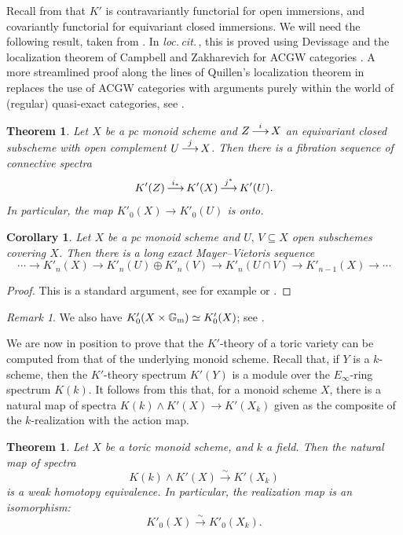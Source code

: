 \documentclass[12pt]{amsart}
\def\lra{\longrightarrow}
\def\map#1{\,{\buildrel #1 \over \lra}\,}
\newcommand{\G}{\mathbb{G}}
\newcommand{\Gm}{\G_{\text m}}
\numberwithin{equation}{section}
\theoremstyle{plain}
\newtheorem{thm}[equation]{Theorem}
\newtheorem{cor}[equation]{Corollary}
\theoremstyle{definition}
\theoremstyle{remark}
\newtheorem{rem}[equation]{Remark}
\begin{document}
Recall from \cite[5.1.2]{HW} that $K'$ is contravariantly functorial
for open immersions, and covariantly functorial for equivariant closed
immersions. We will need the following result, taken from
\cite[Thm. 5.3]{HW}. In {\it loc.\,cit.\,}, this is proved using
Devissage \cite[Thm. 3.2]{HW} and the localization theorem of Campbell
and Zakharevich for ACGW categories \cite[8.5]{CZ}. A more streamlined
proof along the lines of Quillen's localization theorem in
\cite[Section 7]{Quillen} replaces the use of ACGW categories with
arguments purely within the world of (regular) quasi-exact categories,
see \cite[Section 4]{CW}.
 

\begin{thm}\label{thm:K-loc}
	Let $X$ be a pc monoid scheme and $Z\map{i} X$ an equivariant closed subscheme
	with open complement $U\map{j} X$. Then there is a fibration sequence of connective spectra
	\[
	K'(Z)\map{i_*} K'(X) \map{j^*} K'(U).
	\]
In particular, the map $K'_0(X)\to K'_0(U)$ is onto. 
\end{thm}

\begin{cor}\label{cor:K'-MV}
  Let $X$ be a pc monoid scheme and $U,\,V\subseteq X$
  open subschemes covering $X$. 
	Then there is a long exact Mayer--Vietoris sequence
\[
\dotsm \to K'_n(X)\to K'_n(U)\oplus K'_n(V)\to K'_n(U\cap V) \to K'_{n-1}(X)\to \dotsm
\]
\end{cor}

\begin{proof}
  This is a standard argument, see for example
  \cite[Prop.\,4]{BG} or \cite[V.6.11.2]{WK}.
\end{proof}

\begin{rem}
We also have $K'_0(X\times\Gm)\simeq K'_0(X)$; see \cite[5.4]{HW}.
\end{rem}

We are now in position to prove that the $K'$-theory of a toric
variety can be computed from that of the underlying monoid
scheme. Recall that, if $Y$ is a $k$-scheme, then the $K'$-theory
spectrum $K'(Y)$ is a module over the $E_\infty$-ring spectrum
$K(k)$. It follows from this that, for a monoid scheme $X$, there is a
natural map of spectra $K(k)\wedge K' (X)\to K'(X_k)$ given as the
composite of the $k$-realization with the action map.

\begin{thm}\label{thm:comparison}
Let $X$ be a toric monoid scheme, and $k$ a field.
Then the natural map of spectra 
\[ K(k)\wedge K' (X)\xrightarrow{\sim} K'(X_k) \]
is a weak homotopy equivalence. 
%
In particular, the realization map is an isomorphism:
\[ K'_0(X)\xrightarrow{\sim} K'_0(X_k). \]
\end{thm}
\end{document}
